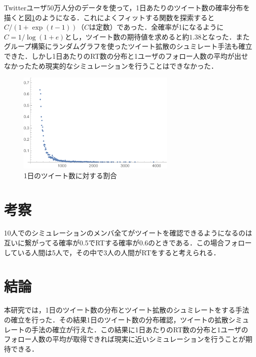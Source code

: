 \documentclass[uplatex,twocolumn,dvipdfmx]{jsarticle}
\begin{document}
Twitterユーザ50万人分のデータを使って，1日あたりのツイート数の確率分布を描くと図\ref{ツイートの分布}のようになる．これによくフィットする関数を探索すると$C/(1+\exp(t-1))$（$C$は定数）であった．全確率が1になるように$C=1/\log(1+e)$とし，ツイート数の期待値を求めると約$1.38$となった．またグループ構築にランダムグラフを使ったツイート拡散のシュミレート手法も確立できた．しかし1日あたりのRT数の分布と1ユーザのフォロー人数の平均が出せなかったため現実的なシミュレーションを行うことはできなかった．

\begin{figure}[htb]
\centering
\includegraphics[width=77mm,clip]{tweets.pdf}
\caption{1日のツイート数に対する割合}\label{ツイートの分布}
\end{figure}

\section{考察}

10人でのシミュレーションのメンバ全てがツイートを確認できるようになるのは互いに繋がってる確率が0.5でRTする確率が0.6のときである．この場合フォローしている人間は5人で，その中で3人の人間がRTをすると考えられる．

\section{結論}

本研究では，1日のツイート数の分布とツイート拡散のシュミレートをする手法の確立を行った．その結果1日のツイート数の分布確認，ツイートの拡散シミュレートの手法の確立が行えた．この結果に1日あたりのRT数の分布と1ユーザのフォロー人数の平均が取得できれば現実に近いシミュレーションを行うことが期待できる．


\end{document}
